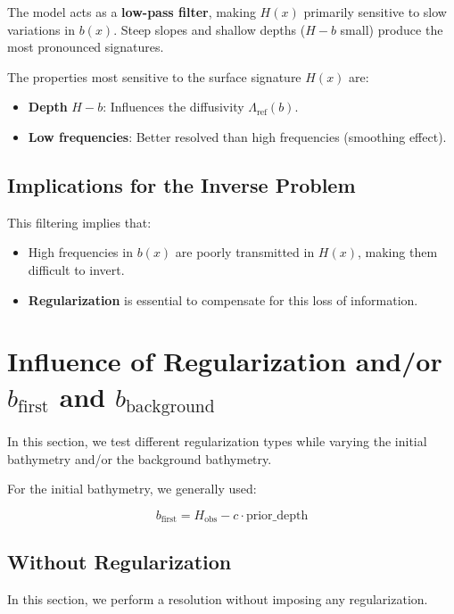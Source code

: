 \documentclass{article}
\begin{document}
The model acts as a \textbf{low-pass filter}, making \( H(x) \) primarily sensitive to slow variations in \( b(x) \). Steep slopes and shallow depths (\( H-b \) small) produce the most pronounced signatures.

The properties most sensitive to the surface signature \( H(x) \) are:
\begin{itemize}
    \item \textbf{Depth} \( H-b \): Influences the diffusivity \( \Lambda_{\text{ref}}(b) \).
    \item \textbf{Low frequencies}: Better resolved than high frequencies (smoothing effect).
\end{itemize}

\subsection{Implications for the Inverse Problem}

This filtering implies that:
\begin{itemize}
    \item High frequencies in \( b(x) \) are poorly transmitted in \( H(x) \), making them difficult to invert.
    \item \textbf{Regularization} is essential to compensate for this loss of information.
\end{itemize}

\section{Influence of Regularization and/or \( b_{\text{first}} \) and \( b_{\text{background}} \)}

In this section, we test different regularization types while varying the initial bathymetry and/or the background bathymetry.

For the initial bathymetry, we generally used:

\[
b_{\text{first}} = H_{\text{obs}} - c \cdot \text{prior\_depth}
\]

\subsection{Without Regularization}

In this section, we perform a resolution without imposing any regularization.
\end{document}
